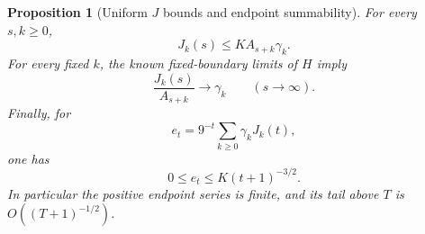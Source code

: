 \documentclass[11pt,letterpaper]{article}
\newtheorem{proposition}[theorem]{Proposition}
\theoremstyle{remark}\newtheorem{remark}[theorem]{Remark}
\numberwithin{equation}{section}
\begin{document}
\begin{proposition}[Uniform $J$ bounds and endpoint summability]\label{upo:1243:prop:J}
For every $s,k\ge0$,
\begin{equation}\label{upo:1243:eq:Jdom}
 J_k(s)\le K A_{s+k}\gamma_k.
\end{equation}
For every fixed $k$, the known fixed-boundary limits of $H$ imply
\begin{equation}\label{upo:1243:eq:Jlimit}
 \frac{J_k(s)}{A_{s+k}}\longrightarrow\gamma_k
 \qquad(s\longrightarrow\infty).
\end{equation}
Finally, for
\begin{equation}\label{upo:1243:eq:e}
 e_t=9^{-t}\sum_{k\ge0}\gamma_kJ_k(t),
\end{equation}
one has
\begin{equation}\label{upo:1243:eq:esummable}
 0\le e_t\le K(t+1)^{-3/2}.
\end{equation}
In particular the positive endpoint series is finite, and its tail above
$T$ is $O((T+1)^{-1/2})$.
\end{proposition}
\end{document}
